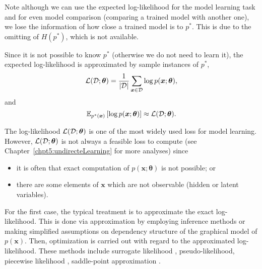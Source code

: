 Note although we can use the expected log-likelihood for the model learning task and for even model comparison (comparing a trained model with another one), we lose the information of how close a trained model is to $p^{\ast}$. This is due to the omitting of $H(p^{\ast})$, which is not available.

Since it is not possible to know $p^{\ast}$ (otherwise we do not need to learn it), the expected log-likelihood is approximated by sample instances of $p^{\ast}$,
\begin{equation}
  \mathcal{L}(\mathcal{D}; \bm{\theta}) = \frac{1}{| \mathcal{D} |}\sum_{\bm{x}\in \mathcal{D}}\log{p(\bm{x};\bm{\theta})},
\end{equation}
and
\begin{equation}
  \mathbb{E}_{p^{\ast}(\bm{x})}\left[ \log{{p(\bm{x}; \bm{\theta})}} \right] \approx \mathcal{L}(\mathcal{D}; \bm{\theta}).
\end{equation}


The log-likelihood $\mathcal{L}(\mathcal{D}; \bm{\theta})$ is one of the most widely used loss for model learning. However, $\mathcal{L}(\mathcal{D}; \bm{\theta})$ is not always a feasible loss to compute (see Chapter~\ref{chpt5:undirecteLearning} for more analyses) since
\begin{itemize}
\item it is often that exact computation of $p(\bm{x};\bm{\theta})$ is not possible; or
\item there are some elements of $\bm{x}$ which are not observable (hidden or latent variables).
\end{itemize}
For the first case, the typical treatment is to approximate the exact log-likelihood. This is done via approximation by employing inference methods or   making simplified assumptions on dependency structure of the graphical model of $p(\bm{x})$. Then, optimization is carried out with regard to the approximated log-likelihood. These methods include surrogate likelihood \cite{wainwright06estimating, lu2019blockBP}, pseudo-likelihood\cite{qu2019gmnn, lazarogredilla2019learning}, piecewise likelihood \cite{sutton2012piecewise, lin_2016_CVPR}, saddle-point approximation \cite{srikumar-etal-2012-amortizing, NIPS2019_9687}.

